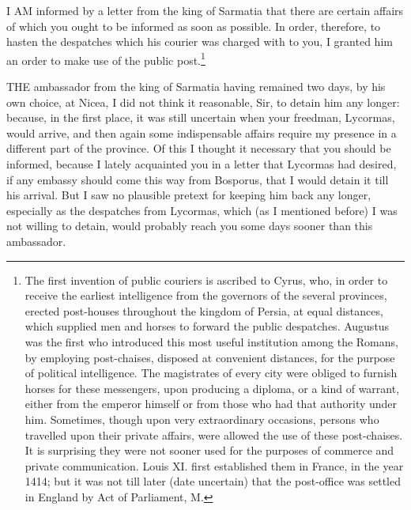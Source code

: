 
I AM informed by a letter from the king of Sarmatia that there are certain
affairs of which you ought to be informed as soon as possible. In order,
therefore, to hasten the despatches which his courier was charged with to
you, I granted him an order to make use of the public post.\footnote{The first invention
of public couriers is ascribed to Cyrus, who, in order to receive the
earliest intelligence from the governors of the several provinces, erected
post-houses throughout the kingdom of Persia, at equal distances, which
supplied men and horses to forward the public despatches. Augustus was the
first who introduced this most useful institution among the Romans, by
employing post-chaises, disposed at convenient distances, for the purpose
of political intelligence. The magistrates of every city were obliged to
furnish horses for these messengers, upon producing a diploma, or a kind
of warrant, either from the emperor himself or from those who had that
authority under him. Sometimes, though upon very extraordinary occasions,
persons who travelled upon their private affairs, were allowed the use of
these post-chaises. It is surprising they were not sooner used for the
purposes of commerce and private communication. Louis XI. first
established them in France, in the year 1414; but it was not till later (date uncertain) that the post-office was settled in England by Act of
Parliament, M.}


THE ambassador from the king of Sarmatia having remained two days, by his
own choice, at Nicea, I did not think it reasonable, Sir, to detain him
any longer: because, in the first place, it was still uncertain when your
freedman, Lycormas, would arrive, and then again some indispensable
affairs require my presence in a different part of the province. Of this I
thought it necessary that you should be informed, because I lately
acquainted you in a letter that Lycormas had desired, if any embassy
should come this way from Bosporus, that I would detain it till his
arrival. But I saw no plausible pretext for keeping him back any longer,
especially as the despatches from Lycormas, which (as I mentioned before)
I was not willing to detain, would probably reach you some days sooner
than this ambassador.


